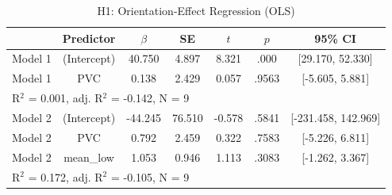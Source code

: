 \begin{table}[ht]
\centering
\caption{H1: Orientation-Effect Regression (OLS)}
\label{tab:h1-regression}
\begin{tabular}{lcccccc}
\toprule
& Predictor & $\beta$ & SE & $t$ & $p$ & 95\% CI \\
\midrule
Model 1 & (Intercept) & 40.750 & 4.897 & 8.321 & .000 & [29.170, 52.330] \\
Model 1 & PVC & 0.138 & 2.429 & 0.057 & .9563 & [-5.605, 5.881] \\
\multicolumn{7}{l}{R$^2$ = 0.001, adj. R$^2$ = -0.142, N = 9} \\
\addlinespace
Model 2 & (Intercept) & -44.245 & 76.510 & -0.578 & .5841 & [-231.458, 142.969] \\
Model 2 & PVC & 0.792 & 2.459 & 0.322 & .7583 & [-5.226, 6.811] \\
Model 2 & mean_low & 1.053 & 0.946 & 1.113 & .3083 & [-1.262, 3.367] \\
\multicolumn{7}{l}{R$^2$ = 0.172, adj. R$^2$ = -0.105, N = 9} \\
\bottomrule
\end{tabular}
\end{table}

